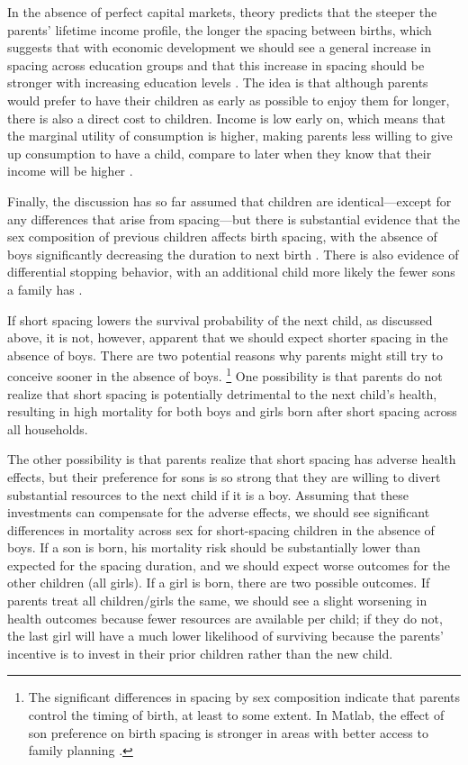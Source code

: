 \documentclass[12pt,letterpaper]{article}
\begin{document}
In the absence of perfect capital markets, theory predicts that the steeper 
the parents' lifetime income profile, the longer the spacing between births, 
which suggests that with economic development we should see a general increase 
in spacing across education groups and that this increase in spacing should be 
stronger with increasing education levels
\citep{Heckman1976,wolpin84,Newman1988}.
The idea is that although parents would prefer to have their children as early 
as possible to enjoy them for longer, there is also a direct cost to children.
Income is low early on, which means that the marginal utility of consumption is 
higher, making parents less willing to give up consumption to have a child, 
compare to later when they know that their income will be higher 
\citep{Newman1984,Happel1984}.

Finally, the discussion has so far assumed that children are identical---except 
for any differences that arise from spacing---but there is substantial evidence 
that the sex composition of previous children affects birth spacing, with the
absence of boys significantly decreasing the duration to next birth
\citep{Haughton1995,Haughton1996,Rahman1993,Bhalotra2008,Kumar2016,Soest2018}.
There is also evidence of differential stopping behavior, with an additional child 
more likely the fewer sons a family has 
\citep{repetto72,Das1987,Arnold1997,arnold98,clark00,Basu2010,Barcellos2014}.

If short spacing lowers the survival probability of the next child, as discussed above,
it is not, however, apparent that we should expect shorter spacing in the absence of boys.
There are two potential reasons why parents might still try to conceive sooner 
in the absence of boys.%
\footnote{
The significant differences in spacing by sex composition indicate that
parents control the timing of birth, at least to some extent.
In Matlab, the effect of son preference on birth spacing is stronger in 
areas with better access to family planning \citep{Rahman1993}.
}
One possibility is that parents do not realize that short spacing is potentially
detrimental to the next child's health, resulting in high mortality for both boys 
and girls born after short spacing across all households.

The other possibility is that parents realize that short spacing has adverse 
health effects, but their preference for sons is so strong that they are willing to 
divert substantial resources to the next child if it is a boy.
Assuming that these investments can compensate for the adverse effects,
we should see significant differences in mortality across sex for short-spacing 
children in the absence of boys.
If a son is born, his mortality risk should be substantially lower than expected 
for the spacing duration, and we should expect worse outcomes for the other 
children (all girls).
If a girl is born, there are two possible outcomes.
If parents treat all children/girls the same, we should see a slight worsening in 
health outcomes because fewer resources are available per child; 
if they do not, the last girl will have a much lower likelihood of surviving 
because the parents' incentive is to invest in their prior children rather than 
the new child.
\end{document}

